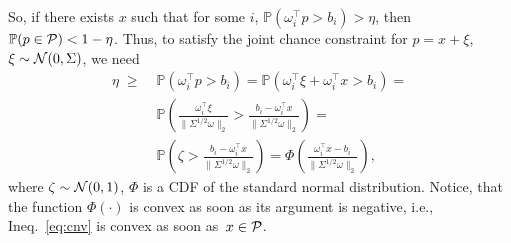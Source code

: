 \documentclass{IEEEtran4PSCC}
\newcommand{\cP}{{\cal P}}
\newcommand{\cN}{{\cal N}}
\begin{document}
So, if there exists $x$ such that for some $i$, $\mathbb{P}(\omega_i^\top p > b_i) > \eta$, then $\mathbb{P}(p\in \cP) < 1-\eta$. Thus, to satisfy the joint chance constraint for $p = x+\xi$, $\xi\sim \cN(0, \Sigma)$, we need
\begin{align}
  \eta \;\ge\; & \mathbb{P}(\omega_i^\top p > b_i) = \mathbb{P}(\omega_i^\top \xi + \omega_i^\top x > b_i) = \nonumber\\
  & 
  \mathbb{P}\left(\frac{\omega_i^\top \xi}{\|\Sigma^{1/2}\omega\|_2} > \frac{b_i - \omega_i^\top x}{\|\Sigma^{1/2}\omega\|_2}\right) = \nonumber\\
  & \mathbb{P}\left(\zeta > \frac{b_i - \omega_i^\top x}{\|\Sigma^{1/2}\omega\|_2}\right) = \Phi\left(\frac{\omega_i^\top x - b_i}{\|\Sigma^{1/2}\omega\|_2}\right), \label{eq:cnv}
\end{align}
where $\zeta\sim \cN(0,1)$, $\Phi$ is a CDF of the standard normal distribution. Notice, that the function $\Phi(\cdot)$ is convex as soon as its argument is negative, i.e., Ineq.~\eqref{eq:cnv} is convex as soon as~$x\in \cP$. 
\end{document}
